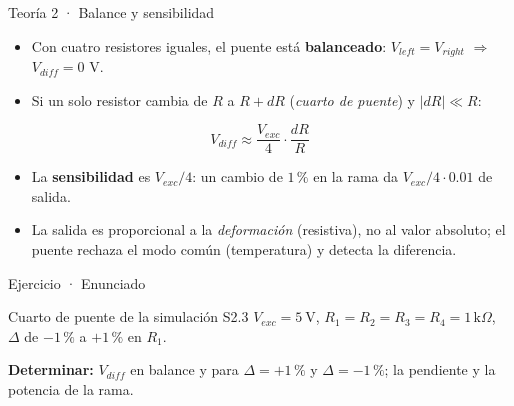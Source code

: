 \documentclass[aspectratio=169]{beamer}
\begin{document}
\begin{frame}{Teoría 2 · Balance y sensibilidad}
  \begin{itemize}
    \item Con cuatro resistores iguales, el puente está \textbf{balanceado}: $V_{left}=V_{right}$ $\Rightarrow$ $V_{diff} = 0$ V.
    \item Si un solo resistor cambia de $R$ a $R+dR$ (\emph{cuarto de puente}) y $|dR|\ll R$:
  \end{itemize}
  \[
    V_{diff} \approx \frac{V_{exc}}{4}\cdot\frac{dR}{R}
  \]
  \pause
  \begin{itemize}
    \item La \textbf{sensibilidad} es $V_{exc}/4$: un cambio de $1\,\text{\%}$ en la rama da
      $V_{exc}/4 \cdot 0.01$ de salida.
    \item La salida es proporcional a la \emph{deformación} (resistiva), no al valor absoluto;
      el puente rechaza el modo común (temperatura) y detecta la diferencia.
  \end{itemize}
\end{frame}

\begin{frame}{Ejercicio · Enunciado}
  \begin{block}{Cuarto de puente de la simulación S2.3}
    \centering
    $V_{exc} = \SI{5}{\volt}$, \quad $R_1 = R_2 = R_3 = R_4 = 1\,\text{k}\Omega$, \quad $\Delta$ de $-1\,\text{\%}$ a $+1\,\text{\%}$ en $R_1$.
  \end{block}
  \begin{center}
  \end{center}
  \textbf{Determinar:} $V_{diff}$ en balance y para $\Delta = +1\,\text{\%}$ y $\Delta = -1\,\text{\%}$; la pendiente y la potencia de la rama.
\end{frame}
\end{document}
